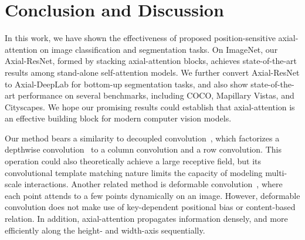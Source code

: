 \documentclass[runningheads]{llncs}
\begin{document}
    \begin{table}[!t]
    \caption{Varying axial-attention span on Cityscapes val set}
    \label{tab:ablation2}
    \setlength{\tabcolsep}{0.7em}
        \centering
    \end{table}
%
 
\section{Conclusion and Discussion}
\label{sec:discussion}

In this work, we have shown the effectiveness of proposed position-sensitive axial-attention on image classification and segmentation tasks. On ImageNet, our Axial-ResNet, formed by stacking axial-attention blocks, achieves state-of-the-art results among stand-alone self-attention models. We further convert Axial-ResNet to Axial-DeepLab for bottom-up segmentation tasks, and also show state-of-the-art performance on several benchmarks, including COCO, Mapillary Vistas, and Cityscapes. We hope our promising results could establish that axial-attention is an effective building block for modern computer vision models.

Our method bears a similarity to decoupled convolution~\cite{DBLP:conf/bmvc/JaderbergVZ14}, which factorizes a depthwise convolution~\cite{sifre2014rigid,howard2017mobilenets,chollet2016xception} to a column convolution and a row convolution. This operation could also theoretically achieve a large receptive field, but its convolutional template matching nature limits the capacity of modeling multi-scale interactions. Another related method is deformable convolution~\cite{dai2017deformable,zhu2019deformable,gao2019deformable}, where each point attends to a few points dynamically on an image. However, deformable convolution does not make use of key-dependent positional bias or content-based relation. In addition, axial-attention propagates information densely, and more efficiently along the height- and width-axis sequentially.
\end{document}
